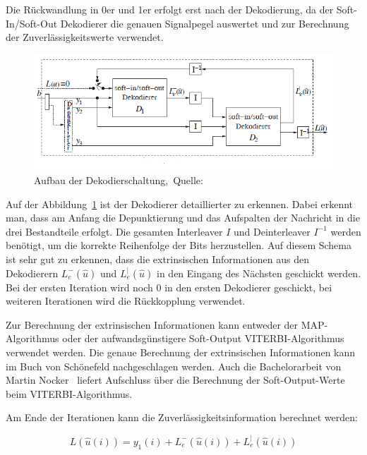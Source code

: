 Die Rückwandlung in 0er und 1er erfolgt erst nach der Dekodierung, da der Soft-In/Soft-Out Dekodierer die genauen Signalpegel auswertet und zur Berechnung der Zuverlässigkeitswerte verwendet. 

\begin{figure}[th]
\centering
\includegraphics[width=\ScaleIfNeeded]{pictures/TurboDecoderSchema}
\caption{Aufbau der Dekodierschaltung,~Quelle:~\cite[262]{schoenfeld2012informations}}
\label{pic:decoderSchema}
\end{figure}

Auf der Abbildung~\ref{pic:decoderSchema} ist der Dekodierer detaillierter zu erkennen. Dabei erkennt man, dass am Anfang die Depunktierung und das Aufspalten der Nachricht in die drei Bestandteile erfolgt. Die gesamten Interleaver $I$ und Deinterleaver $I^{-1}$ werden benötigt, um die korrekte Reihenfolge der Bits herzustellen. Auf diesem Schema ist sehr gut zu erkennen, dass die extrinsischen Informationen aus den Dekodierern $L^-_e(\widehat{u})$ und $L^|_e(\widehat{u})$ in den Eingang des Nächsten geschickt werden. Bei der ersten Iteration wird noch 0 in den ersten Dekodierer geschickt, bei weiteren Iterationen wird die Rückkopplung verwendet.

Zur Berechnung der extrinsischen Informationen kann entweder der MAP-Algorithmus \cite[233-236]{schoenfeld2012informations} oder der aufwandsgünstigere Soft-Output VITERBI-Algorithmus \cite[222-233]{schoenfeld2012informations} verwendet werden. Die genaue Berechnung der extrinsischen Informationen kann im Buch von Schönefeld \cite[S.~263~f.]{schoenfeld2012informations} nachgeschlagen werden. Auch die Bachelorarbeit von Martin Nocker~\cite[7-11]{nocker} liefert Aufschluss über die Berechnung der Soft-Output-Werte beim VITERBI-Algorithmus.

Am Ende der Iterationen kann die Zuverlässigkeitsinformation berechnet werden:

\begin{equation}
L(\widehat{u}(i))=y_1(i)+L^-_e(\widehat{u}(i))+L^|_e(\widehat{u}(i))
\label{eq:resultDecode}
\end{equation}


